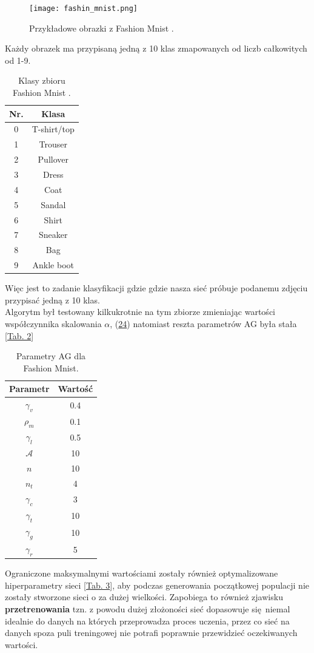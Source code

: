 \documentclass{article}
\begin{document}
\begin{figure}[H]
\centering
\texttt{[image: fashin\_mnist.png]}
\caption{Przykładowe obrazki z Fashion Mnist \cite{fm}.}
\end{figure}
Każdy obrazek ma przypisaną jedną z 10 klas zmapowanych od liczb całkowitych od 1-9.
\begin{table}[H]
\centering
\begin{tabular}{|c|c|}
	\hline
	Nr. & Klasa \\
	\hline
	0 & T-shirt/top \\
	1 & Trouser \\
	2 & Pullover \\
	3 & Dress \\
	4 & Coat \\
	5 & Sandal \\
	6 & Shirt \\
	7 & Sneaker \\
	8 & Bag \\
	9 & Ankle boot \\
	\hline
\end{tabular}
\caption{\label{tab:fmcls}Klasy zbioru Fashion Mnist \cite{fm}.}
\end{table}
Więc jest to zadanie klasyfikacji gdzie gdzie nasza sieć próbuje podanemu zdjęciu przypisać jedną
z 10 klas.\\
Algorytm był testowany kilkukrotnie na tym zbiorze zmieniając wartości współczynnika
skalowania $\alpha$, (\hyperref[eq:cost]{24}) natomiast reszta
parametrów AG była stała [\hyperref[tab:params]{Tab. 2}]\\
\begin{table}[H]
\centering
\begin{tabular}{|c|c|}
	\hline
	Parametr & Wartość\\
	\hline
	 $\gamma_v$ &0.4\\
	 $\rho_m$ &0.1\\
	 $\gamma_l$& 0.5\\
	 $\mathcal{A}$ &10\\
	 $n$  &10\\
	 $n_t$  &4\\
	 $\gamma_c$  &3\\
	 $\gamma_t$ &10\\
	 $\gamma_g$ &10\\
	 $\gamma_r$ &5\\
	\hline
\end{tabular}
\caption{\label{tab:fm_params}Parametry AG dla Fashion Mnist.}
\end{table}
Ograniczone maksymalnymi wartościami zostały również optymalizowane hiperparametry sieci 
[\hyperref[tab:zakres]{Tab. 3}], aby podczas generowania początkowej populacji 
nie zostały stworzone sieci o za dużej wielkości. Zapobiega to również zjawisku 
\textbf{przetrenowania} tzn. z powodu dużej złożoności sieć dopasowuje się niemal idealnie
do danych na których przeprowadza proces uczenia, przez co sieć na danych spoza puli treningowej
nie potrafi poprawnie przewidzieć oczekiwanych wartości.
\end{document}
